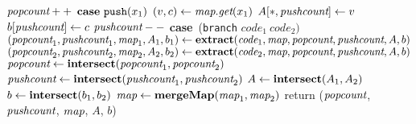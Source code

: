 \begin{algorithm}
\begin{algorithmic}
\STATE $\mbox{\it popcount}++$
\UND
\STATE \vspace{-6pt}
\STATE $\mbox{\bf case}~\mbox{\tt push}(x_1)$
\IND
\STATE $(v, c) \leftarrow \mbox{\it map}.\mbox{\it get}(x_1)$
\STATE $A[*, \mbox{\it pushcount}] \leftarrow v$
\STATE $b[\mbox{\it pushcount}] \leftarrow c$
\STATE $\mbox{\it pushcount}--$
\UND
\STATE \vspace{-6pt}
\STATE \mbox{\bf case}~({\tt branch} $code_1~code_2)$
\IND
\STATE $(\mbox{\it popcount}_1, \mbox{\it pushcount}_1, \mbox{\it map}_1, A_1, b_1) \leftarrow {\mbox{\bf extract}}(\mbox{\it code}_1, \mbox{\it map}, \mbox{\it popcount}, \mbox{\it pushcount}, A, b)$
\STATE $(\mbox{\it popcount}_2, \mbox{\it pushcount}_2, \mbox{\it map}_2, A_2, b_2) \leftarrow {\mbox{\bf extract}}(\mbox{\it code}_2, \mbox{\it map}, \mbox{\it popcount}, \mbox{\it pushcount}, A, b)$
\STATE $\mbox{\it popcount} \leftarrow {\mbox{\bf intersect}}(\mbox{\it popcount}_1, \mbox{\it popcount}_2)$
\STATE $\mbox{\it pushcount} \leftarrow {\mbox{\bf intersect}}(\mbox{\it pushcount}_1, \mbox{\it pushcount}_2)$
\STATE $A \leftarrow \mbox{\bf intersect}( A_1, A_2 )$
\STATE $b \leftarrow \mbox{\bf intersect}( b_1, b_2 )$
\STATE $\mbox{\it map} \leftarrow {\bf mergeMap}(\mbox{\it map}_1, \mbox{\it map}_2)$
\UND
\UND %
\ENDFOR
\STATE return ($\mbox{\it popcount}$, $\mbox{\it pushcount}$, $\mbox{\it map}$, $A$, $b$)
\end{algorithmic}
\end{algorithm}

\clearpage